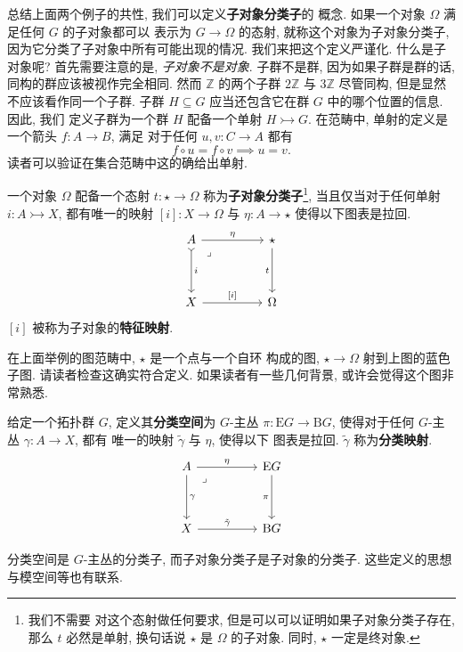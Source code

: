总结上面两个例子的共性, 我们可以定义\textbf{子对象分类子}的
概念. 如果一个对象 \(\Omega\) 满足任何 \(G\) 的子对象都可以
表示为 \(G \to \Omega\) 的态射, 就称这个对象为子对象分类子,
因为它分类了子对象中所有可能出现的情况.
我们来把这个定义严谨化. 什么是子对象呢? 首先需要注意的是,
\emph{子对象不是对象}. 子群不是群, 因为如果子群是群的话,
同构的群应该被视作完全相同. 然而 \(\mathbb Z\)
的两个子群 \(2\mathbb Z\) 与 \(3\mathbb Z\)
尽管同构, 但是显然不应该看作同一个子群. 子群 \(H \subseteq G\)
应当还包含它在群 \(G\) 中的哪个位置的信息. 因此, 我们
定义子群为一个群 \(H\) 配备一个单射 \(H \rightarrowtail G\).
在范畴中, 单射的定义是一个箭头 \(f : A \to B\), 满足
对于任何 \(u,v : C \to A\) 都有
\[f\circ u = f \circ v \implies u = v.\]
读者可以验证在集合范畴中这的确给出单射.

\begin{definition}
一个对象 \(\Omega\) 配备一个态射
\(t : \star \to \Omega\)
称为\textbf{子对象分类子}\footnote{我们不需要
对这个态射做任何要求, 但是可以可以证明如果子对象分类子存在,
那么 \(t\) 必然是单射, 换句话说 \(\star\) 是 \(\Omega\)
的子对象. 同时, \(\star\) 一定是终对象.}, 当且仅当对于任何单射
\(i : A \rightarrowtail X\), 都有唯一的映射
\([i] : X \to \Omega\) 与 \(\eta : A \to \star\)
使得以下图表是拉回.
\[\begin{tikzcd}
A && \star \\
\\
X && \Omega
\arrow["{[i]}", from=3-1, to=3-3]
\arrow["t"', from=1-3, to=3-3]
\arrow["i", tail, from=1-1, to=3-1]
\arrow["\eta", from=1-1, to=1-3]
\arrow["\lrcorner"{anchor=center, pos=0.125}, draw=none, from=1-1, to=3-3]
\end{tikzcd}\]
\([i]\) 被称为子对象的\textbf{特征映射}.
\end{definition}

在上面举例的图范畴中, \(\star\) 是一个点与一个自环
构成的图, \(\star \to \Omega\) 射到上图的蓝色子图.
请读者检查这确实符合定义. 如果读者有一些几何背景,
或许会觉得这个图非常熟悉.
\begin{definition}
给定一个拓扑群 \(G\), 定义其\textbf{分类空间}为
\(G\)-主丛 \(\pi : \mathrm{E}G \to \mathrm{B}G\),
使得对于任何 \(G\)-主丛 \(\gamma : A \to X\), 都有
唯一的映射 \(\tilde\gamma\) 与 \(\eta\), 使得以下
图表是拉回. \(\tilde\gamma\) 称为\textbf{分类映射}.
\[\begin{tikzcd}
A && \mathrm{E}G \\
\\
X && \mathrm{B}G
\arrow["{\tilde\gamma}", from=3-1, to=3-3]
\arrow["\pi"', from=1-3, to=3-3]
\arrow["\gamma", from=1-1, to=3-1]
\arrow["\eta", from=1-1, to=1-3]
\arrow["\lrcorner"{anchor=center, pos=0.125}, draw=none, from=1-1, to=3-3]
\end{tikzcd}\]
\end{definition}
分类空间是 \(G\)-主丛的分类子,
而子对象分类子是子对象的分类子.
这些定义的思想与模空间等也有联系.

